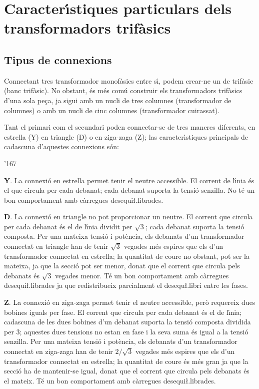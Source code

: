 \section{Caracter\'{\i}stiques particulars  dels transformadors trif\`{a}sics}

\subsection{Tipus de connexions}

Connectant tres transformador monof\`{a}sics entre s\'{\i}, podem crear-ne un de trif\`{a}sic (banc trif\`{a}sic). No obstant, \'{e}s m\'{e}s com\'{u} construir els transformadors trif\`{a}sics d'una sola pe\c{c}a, ja sigui amb un nucli de tres columnes (transformador de columnes) o amb un nucli de cinc columnes (transformador cuirassat).

Tant el primari com el secundari poden connectar-se de tres maneres diferents, en estrella (Y) en triangle (D) o en ziga-zaga (Z); las caracter\'{\i}stiques principals de cadascuna d'aquestes connexions s\'{o}n:

\begin{dinglist}{'167}
   \item \textbf{Y}. La connexi\'{o} en estrella permet tenir el neutre accessible. El corrent de l\'{\i}nia \'{e}s el que circula per cada debanat; cada debanat suporta la tensi\'{o} senzilla. No t\'{e} un bon comportament amb c\`{a}rregues desequi{\l.l}ibrades.
   \item \textbf{D}. La connexi\'{o} en triangle no pot proporcionar un neutre. El corrent que circula per cada debanat \'{e}s el de l\'{\i}nia dividit per $\sqrt{3}$; cada debanat suporta la tensi\'{o} composta. Per una mateixa tensi\'{o} i pot\`{e}ncia, els debanats d'un transformador connectat en triangle han de tenir $\sqrt{3}$ vegades m\'{e}s espires que els d'un transformador connectat en estrella; la quantitat de coure no obstant, pot ser la mateixa, ja que la secci\'{o} pot ser menor, donat que el corrent que circula pels debanats \'{e}s $\sqrt{3}$ vegades menor. T\'{e} un bon comportament amb c\`{a}rregues desequi{\l.l}ibrades ja que redistribueix parcialment el desequ{\l.l}ibri entre les fases.
   \item \textbf{Z}. La connexi\'{o} en ziga-zaga permet tenir el neutre accessible, per\`{o} requereix dues bobines iguals per fase. El corrent que circula per cada debanat \'{e}s el de l\'{\i}nia; cadascuna de les dues bobines d'un debanat suporta la tensi\'{o} composta dividida per 3; aquestes dues tensions no estan en fase i la seva suma \'{e}s igual a la tensi\'{o} senzilla. Per una mateixa tensi\'{o} i pot\`{e}ncia, els debanats d'un transformador connectat en ziga-zaga han de tenir $2/\sqrt{3}$ vegades m\'{e}s espires que els d'un transformador connectat en estrella; la quantitat de coure \'{e}s m\'{e}s gran ja que la secci\'{o} ha de mantenir-se igual, donat que el corrent que circula pels debanats \'{e}s el mateix. T\'{e} un bon comportament amb c\`{a}rregues desequi{\l.l}ibrades.
\end{dinglist}

